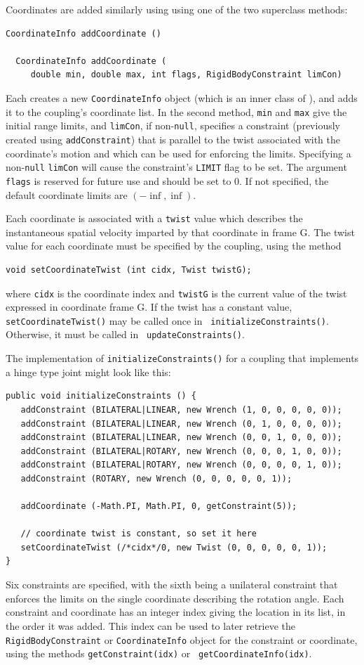 Coordinates are added similarly using using one of the two superclass
methods:
\begin{lstlisting}[]
  CoordinateInfo addCoordinate ()

  CoordinateInfo addCoordinate (
     double min, double max, int flags, RigidBodyConstraint limCon)
\end{lstlisting}
%
Each creates a new {\tt CoordinateInfo} object (which is an inner class
of ), and adds it to the
coupling's coordinate list. In the second method, {\tt min} and {\tt max} give
the initial range limits, and {\tt limCon}, if non-{\tt null}, specifies a
constraint (previously created using {\tt addConstraint}) that is parallel to
the twist associated with the coordinate's motion and which can be used for
enforcing the limits. Specifying a non-{\tt null} {\tt limCon} will cause the
constraint's {\tt LIMIT} flag to be set.  The argument {\tt flags} is reserved
for future use and should be set to 0. If not specified, the default coordinate
limits are $(-\inf, \inf)$.

Each coordinate is associated with a {\tt twist} value which describes the
instantaneous spatial velocity imparted by that coordinate in frame G.  The
twist value for each coordinate must be specified by the coupling, using the
method
\begin{lstlisting}[]
  void setCoordinateTwist (int cidx, Twist twistG);
\end{lstlisting}
where {\tt cidx} is the coordinate index and {\tt twistG} is the current value
of the twist expressed in coordinate frame G.  If the twist has a constant
value, {\tt setCoordinateTwist()} may be called once in {\tt
initializeConstraints()}. Otherwise, it must be called in {\tt
updateConstraints()}.

The implementation of {\tt initializeConstraints()} for a coupling
that implements a hinge type joint might look like this:
%
\begin{lstlisting}[]
public void initializeConstraints () {
   addConstraint (BILATERAL|LINEAR, new Wrench (1, 0, 0, 0, 0, 0));
   addConstraint (BILATERAL|LINEAR, new Wrench (0, 1, 0, 0, 0, 0));
   addConstraint (BILATERAL|LINEAR, new Wrench (0, 0, 1, 0, 0, 0));
   addConstraint (BILATERAL|ROTARY, new Wrench (0, 0, 0, 1, 0, 0));
   addConstraint (BILATERAL|ROTARY, new Wrench (0, 0, 0, 0, 1, 0));
   addConstraint (ROTARY, new Wrench (0, 0, 0, 0, 0, 1));

   addCoordinate (-Math.PI, Math.PI, 0, getConstraint(5));

   // coordinate twist is constant, so set it here
   setCoordinateTwist (/*cidx*/0, new Twist (0, 0, 0, 0, 0, 1));
}
\end{lstlisting}
%
Six constraints are specified, with the sixth being a unilateral
constraint that enforces the limits on the single coordinate
describing the rotation angle.  Each constraint and coordinate has an
integer index giving the location in its list, in the order it was
added. This index can be used to later retrieve the {\tt
RigidBodyConstraint} or {\tt CoordinateInfo} object for the constraint
or coordinate, using the methods {\tt getConstraint(idx)} or {\tt
getCoordinateInfo(idx)}.

